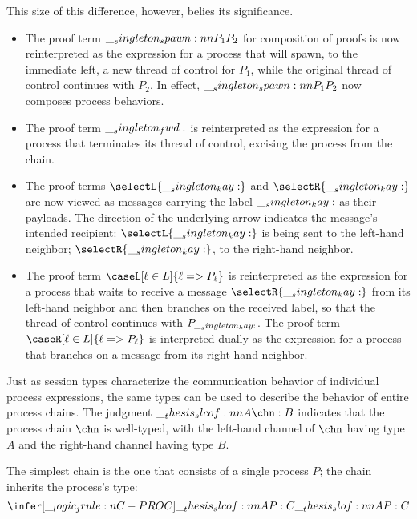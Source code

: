 This size of this difference, however, belies its significance.
\begin{itemize}
\item The proof term $\__singleton_spawn:nn {P_1} {P_2}$ for composition of proofs is now reinterpreted as the expression for a process that will spawn, to the immediate left, a new thread of control for $P_1$, while the original thread of control continues with $P_2$.
  In effect, $\__singleton_spawn:nn {P_1} {P_2}$ now composes process behaviors.

\item The proof term $\__singleton_fwd:$ is reinterpreted as the expression for a process that terminates its thread of control, excising the process from the chain.

\item The proof terms $\selectL{\kay}$ and $\selectR{\kay}$ are now viewed as messages carrying the label $\__singleton_kay:$ as their payloads.
  The direction of the underlying arrow indicates the message's intended recipient: $\selectL{\kay}$ is being sent to the left-hand neighbor; $\selectR{\kay}$, to the right-hand neighbor.

\item The proof term $\caseL[\ell \in L]{\ell => P_{\ell}}$ is reinterpreted as the expression for a process that waits to receive a message $\selectR{\kay}$ from its left-hand neighbor and then branches on the received label, so that the thread of control continues with $P_{\__singleton_kay:}$.
  The proof term $\caseR[\ell \in L]{\ell => P_{\ell}}$ is interpreted dually as the expression for a process that branches on a message from its right-hand neighbor.
\end{itemize}

Just as session types characterize the communication behavior of individual process expressions, the same types can be used to describe the behavior of entire process chains.
The judgment $\slcof{A |- \chn : B}$ indicates that the process chain $\chn$ is well-typed, with the left-hand channel of $\chn$ having type $A$ and the right-hand channel having type $B$.

The simplest chain is the one that consists of a single process $P$; the chain inherits the process's type:
\begin{equation*}
  \infer[\jrule{C-PROC}]{\slcof{A |- P : C}}{
    \slof{A |- P : C}}
\end{equation*}

